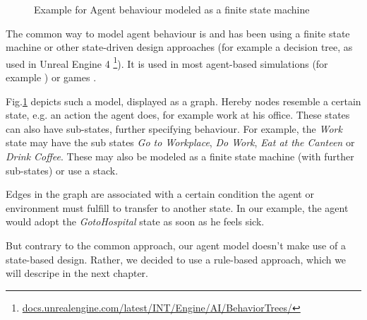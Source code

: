 \documentclass[table]{sig-alternate-05-2015}
\begin{document}
\begin{figure}[h]
\caption{Example for Agent behaviour modeled as a finite state machine}
\label{fig:statemachine}
\end{figure}

The common way to model agent behaviour is and has been using a finite state machine or other state-driven design approaches (for example a decision tree, as used in Unreal Engine 4 \footnote{\url{docs.unrealengine.com/latest/INT/Engine/AI/BehaviorTrees/}}). It is used in most agent-based simulations (for example \cite{biowar}) or games \cite{states}.

Fig.\ref{fig:statemachine} depicts such a model, displayed as a graph. Hereby nodes resemble a certain state, e.g. an action the agent does, for example work at his office. These states can also have sub-states, further specifying behaviour. For example, the \textit{Work} state may have the sub states \textit{Go to Workplace}, \textit{Do Work}, \textit{Eat at the Canteen} or \textit{Drink Coffee}. These may also be modeled as a finite state machine (with further sub-states) or use a stack.

Edges in the graph are associated with a certain condition the agent or environment must fulfill to transfer to another state. In our example, the agent would adopt the \textit{GotoHospital} state as soon as he feels sick.

But contrary to the common approach, our agent model doesn't make use of a state-based design. Rather, we decided to use a rule-based approach, which we will descripe in the next chapter.
\end{document}

